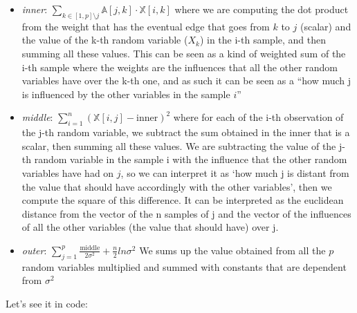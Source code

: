 \documentclass[
]{article}
\providecommand{\tightlist}{%
  \setlength{\itemsep}{0pt}\setlength{\parskip}{0pt}}
\begin{document}
\begin{itemize}
\tightlist
\item
  \emph{inner}:
  \(\sum_{k \in [1,p] \setminus j} \mathbb{A}[j,k]\cdot \mathbb{X}[i,k]\)
  where we are computing the dot product from the weight that has the
  eventual edge that goes from \(k\) to \(j\) (scalar) and the value of
  the k-th random variable (\(X_k\)) in the i-th sample, and then
  summing all these values. This can be seen as a kind of weighted sum
  of the i-th sample where the weights are the influences that all the
  other random variables have over the k-th one, and as such it can be
  seen as a ``how much j is influenced by the other variables in the
  sample \(i\)''
\item
  \emph{middle}:
  \(\sum_{i=1}^n \left( \mathbb{X}[i,j] - \text{inner}\right )^2\) where
  for each of the i-th observation of the j-th random variable, we
  subtract the sum obtained in the inner that is a scalar, then summing
  all these values. We are subtracting the value of the j-th random
  variable in the sample i with the influence that the other random
  variables have had on \(j\), so we can interpret it as `how much j is
  distant from the value that should have accordingly with the other
  variables', then we compute the square of this difference. It can be
  interpreted as the euclidean distance from the vector of the n samples
  of j and the vector of the influences of all the other variables (the
  value that should have) over j.
\item
  \emph{outer}:
  \(\sum_{j=1}^p \frac{\text{middle}}{2\sigma^2} + \frac{n}{2}ln\sigma^2\)
  We sums up the value obtained from all the \(p\) random variables
  multiplied and summed with constants that are dependent from
  \(\sigma^2\)
\end{itemize}

Let's see it in code:
\end{document}
